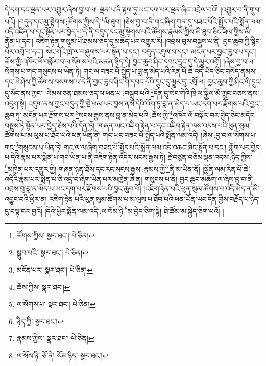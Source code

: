 དེ་དག་དང་ལྡན་པར་འགྱུར་ཞེས་བྱ་བ་ལ། ལྡན་པ་ནི་རྟག་ཏུ་ཡང་དག་པར་ལྡན་ཞིང་འབྲེལ་བའོ། །འགྱུར་བ་ནི་གྲུབ་པའོ། །བདུད་དང་མུ་སྟེགས་:ཚོགས་ཀྱིས་དེ་\footnote{ཚོགས་ཀྱིས་  སྣར་ཐང་།  པེ་ཅིན། }མི་ཐུབ། །ཅེས་བྱ་བ་ནི་གང་ཞིག་ཀུན་དུ་བཟང་པོའི་སྤྱོད་པའི་སྨོན་ལམ་འདི་འཛིན་པ་དང་སྟོན་པར་བྱེད་པ་དེ་ནི་བདུད་དང་མུ་སྟེགས་པའི་ཚོགས་རྣམས་ཀྱིས་མི་ཐུབ་ཅིང་ཟིལ་གྱིས་མི་ནོན་པ་དང་། འཇིག་རྟེན་གསུམ་པོ་ཐམས་ཅད་དུ་མཆོད་པར་འགྱུར་རོ། །འབྲས་བུས་བསྡུས་པ་ནི། བྱང་ཆུབ་ཀྱི་སྙིང་པོར་འགྲོ་བ་དང་། སེང་གེའི་ཁྲི་ལ་བཞུགས་པར་སྟོན་པ་དང་། བདུད་འདུལ་བ་དང་། མངོན་པར་བྱང་ཆུབ་པ་དང་། ཆོས་ཀྱི་འཁོར་ལོ་བསྐོར་བ་ལ་སོགས་པའི་མཚན་ཉིད་དེ། བྱང་ཆུབ་ཤིང་དབང་དྲུང་དུ་དེ་མྱུར་འགྲོ། །ཞེས་བྱ་བ་ལ་སོགས་པ་གང་གསུངས་པ་ཡིན་ཏེ། གང་ལ་བཟང་པོ་སྤྱོད་པ་བླ་ན་མེད་པའི་རིན་པོ་ཆེ་འདི་ཡོད་ཅིང་བསོད་ནམས་དང་ཡེ་ཤེས་ཀྱི་ཚོགས་བསགས་པ་དེ་ནི་བྱང་ཆུབ་ཤིང་གི་དབང་པོའི་དྲུང་དུ་མྱུར་དུ་འགྲོ་ལ། བྱང་ཆུབ་ཀྱི་ཤིང་གི་དྲུང་དུ་སོང་ནས་ཀྱང་། སེམས་ཅན་ཐམས་ཅད་ལ་ཕན་པ་:བསྒྲུབ་པའི་\footnote{སྒྲུབ་པའི་  སྣར་ཐང་།  པེ་ཅིན། }དོན་དུ་སེང་གེའི་ཁྲི་ལ་སྐྱིལ་མོ་ཀྲུང་བཅས་ནས་འདུག་སྟེ། འདུག་ནས་ཀྱང་བདུད་ཀྱི་སྡེ་ཕམ་པར་བྱས་ནས་དེའི་འོག་ཏུ་བླ་ན་མེད་པ་ཡང་དག་པར་རྫོགས་པའི་བྱང་ཆུབ་ཏུ་:མངོན་པར་རྫོགས་པར་\footnote{མངོན་པར་  སྣར་ཐང་།  པེ་ཅིན། }སངས་རྒྱས་ནས་བླ་ན་མེད་པའི་:ཆོས་ཀྱི་\footnote{ཆོས་ཀྱིས་  སྣར་ཐང་། }འཁོར་ལོ་བསྐོར་བར་བྱེད་ཅིང་མདོར་བསྡུས་ཏེ་སྟོན་པར་བྱེད་ཅེས་པའི་དོན་ཏོ། །གཞན་ཡང་འཇིག་རྟེན་པ་དང་འཇིག་རྟེན་ལས་འདས་པའི་ཕུན་སུམ་ཚོགས་པ་མ་ལུས་པ་ཐོབ་པའི་ཕན་ཡོན་ནི། གང་ཡང་བཟང་པོ་སྤྱོད་པའི་སྨོན་ལམ་འདི། །ཞེས་:བྱ་བ་ལ་སོགས་པ་གང་\footnote{ལ་སོགས་པ་  སྣར་ཐང་།  པེ་ཅིན། }གསུངས་པ་ཡིན་ཏེ། གང་ལ་ལ་ཞིག་བཟང་པོ་སྤྱོད་པའི་སྨོན་ལམ་འདི་འཆང་ཞིང་སྟོན་པ་དང་། ཀློག་པར་བྱེད་པ་དེའི་རྣམ་པར་སྨིན་པ་གང་ཡིན་པ་ནི་འཇིག་རྟེན་འདིར་སངས་རྒྱས་ཏེ། རྗེ་བཙུན་བཅོམ་ལྡན་འདས་:ཉིད་ཀྱིས་\footnote{ཉིད་ཀྱི་  སྣར་ཐང་། }མཁྱེན་པར་འགྱུར་གྱི། གཞན་ཉན་ཐོས་དང་རང་སངས་རྒྱས་:རྣམས་ཀྱི་\footnote{རྣམས་ཀྱིས་  སྣར་ཐང་།  པེ་ཅིན། }ནི་མ་ཡིན་ནོ། །སྨོན་ལམ་རིན་པོ་ཆེ་འདིའི་རྣམ་པར་སྨིན་པ་ཅི་འདྲ་བ་ཞིག་ཡིན་པར་མཁྱེན་ཞེ་ན། གསུངས་པ་ནི། བྱང་ཆུབ་མཆོག་ལ་ཞེས་བྱ་བ་ནི་འབྲས་བུ་བླ་ན་མེད་པ་ཡང་དག་པར་རྫོགས་པའི་བྱང་ཆུབ་པོ། །འཇིག་རྟེན་པའི་ཕུན་སུམ་ཚོགས་པ་འདི་མེད་ན་མི་འབྱུང་བའི་ཕྱིར་ན། འཇིག་རྟེན་པའི་ཕུན་སུམ་ཚོགས་པ་མ་ལུས་པ་ཐོབ་པའི་ཕན་ཡོན་ཡང་དོན་གྱིས་བརྗོད་པ་ཉིད་དུ་བལྟ་བར་བྱའོ། །དེའི་ཕྱིར་སྨོན་ལམ་འདི་:ལ་སོམ་ཉི་\footnote{ལ་སོས་ཉི་  ཅོ་ནེ། སོམ་ཉིད་  སྣར་ཐང་། }མ་བྱེད་ཅིག་སྟེ། ཐེ་ཚོམ་མ་སྐྱེད་ཅིག་པའོ། །
